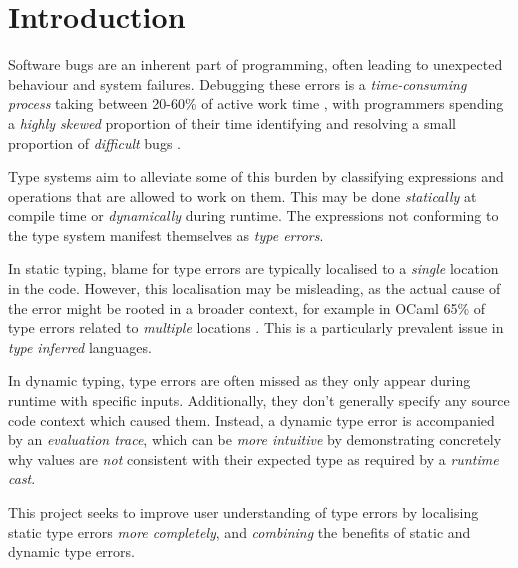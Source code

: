 \chapter{Introduction}
\label{chap:Introduction}
Software bugs are an inherent part of programming, often leading to unexpected behaviour and system failures. Debugging these errors is a \textit{time-consuming process} taking between 20-60\% of active work time \cite{DebugTimeSelfReport}, with programmers spending a \textit{highly skewed} proportion of their time identifying and resolving a small proportion of \textit{difficult} bugs \cite{DebugSkew}.

Type systems aim to alleviate some of this burden by classifying expressions and operations that are allowed to work on them. This may be done \textit{statically} at compile time or \textit{dynamically} during runtime. The expressions not conforming to the type system manifest themselves as \textit{type errors}.

In static typing, blame for type errors are typically localised to a \textit{single} location in the code. However, this localisation may be misleading, as the actual cause of the error might be rooted in a broader context, for example in OCaml 65\% of type errors related to \textit{multiple} locations \cite{StudentTypeErrorFixes}. This is a particularly prevalent issue in \textit{type inferred} languages.

In dynamic typing, type errors are often missed as they only appear during runtime with specific inputs.
Additionally, they don't generally specify any source code context which caused them. Instead, a dynamic type error is accompanied by an \textit{evaluation trace}, which can be \textit{more intuitive} \cite{TraceVisualisation} by demonstrating concretely why values are \textit{not} consistent with their expected type as required by a \textit{runtime cast}.

This project seeks to improve user understanding of type errors by localising static type errors \textit{more completely}, and \textit{combining} the benefits of static and dynamic type errors.


